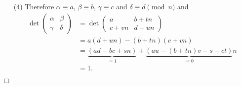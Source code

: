 \documentclass{article}
\begin{document}
\begin{enumerate}
\item[(4)]
  Therefore
  $\alpha \equiv a$, $\beta \equiv b$, $\gamma \equiv c$ and $\delta \equiv d \pmod{n}$
  and
  \begin{align*}
    \det
    \begin{pmatrix}
      \alpha & \beta \\
      \gamma & \delta
    \end{pmatrix}
    &=
    \det
    \begin{pmatrix}
      a & b + tn \\
      c + vn & d + un
    \end{pmatrix} \\
    &=
    a(d+un) - (b+tn)(c+vn) \\
    &=
    \underbrace{(ad - bc + sn)}_{= 1}
      + \underbrace{(au - (b+tn)v - s - ct)}_{= 0}n \\
    &= 1.
  \end{align*}
\end{enumerate}
$\Box$ \\\\



\end{document}
